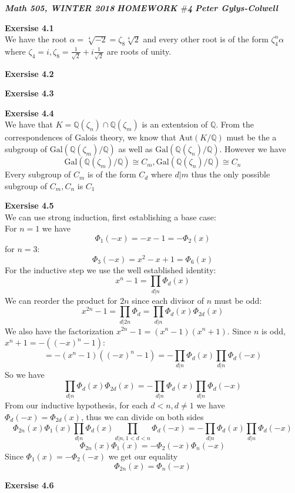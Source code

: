 \documentclass[12pt]{article}
\newenvironment{ques}[1]{\textbf{Exersise #1}\vspace{1 mm}\\ }{\bigskip}
\theoremstyle{definition}
\newcommand{\Q}{\mathbb Q}
\renewcommand{\a}{\alpha}
\newcommand{\Aut}{\text{Aut}}
\newcommand{\Gal}{\text{Gal}}
\begin{document}
\noindent \textit{\textbf{Math 505, WINTER 2018}} \hspace{1.3cm}
\textit{\textbf{HOMEWORK $\#$4}} \hspace{1.3cm} \textit{\textbf{Peter
Gylys-Colwell}} 

\vspace{1cm}

\begin{ques}{4.1}
	We have the root $\a = \sqrt[4]{-2} = \zeta_8\sqrt[4]{2}$ and every other root is
	of the form $\zeta_4^n\a$ where $\zeta_4 = i, \zeta_8 = \frac 1 {\sqrt 2} +
	i \frac 1 {\sqrt 2}$ are roots of unity.\\
\end{ques}

\begin{ques}{4.2}
	
\end{ques}

\begin{ques}{4.3}
	
\end{ques}

\begin{ques}{4.4}
	We have that $K = \Q(\zeta_n) \cap \Q(\zeta_m)$ is an extentsion of $\Q$.
	From the correspondences of Galois theory, we know that $\Aut(K/\Q)$ must be the
	a subgroup of $\Gal(\Q(\zeta_m)/\Q)$ as well as $\Gal(\Q(\zeta_n)/\Q)$.
	However we have
	$$\Gal(\Q(\zeta_m)/\Q) \cong C_m, \Gal(\Q(\zeta_n)/\Q) \cong C_n$$
	Every subgroup of $C_m$ is of the form $C_d$ where $d|m$ thus the only
	possible subgroup of $C_m, C_n$ is $C_1$
\end{ques}

\begin{ques}{4.5}
	We can use strong induction, first establishing a base case:\\
	For $n = 1$ we have
	$$\Phi_1(-x) = -x - 1 = -\Phi_2(x)$$
	for $n = 3$:
	$$\Phi_3(-x) = x^2 - x + 1 = \Phi_6(x)$$
	For the inductive step we use the well established identity:
	$$x^n - 1 = \prod_{d | n} \Phi_d(x)$$
	We can reorder the product for $2n$ since each divisor of $n$ must be odd:
	$$x^{2n} - 1 = \prod_{d|2n}\Phi_d = \prod_{d|n}\Phi_d(x) \Phi_{2d}(x) $$
	We also have the factorization $x^{2n} - 1 = (x^n - 1)(x^n + 1)$. Since $n$
	is odd, $x^n + 1 = -((-x)^n - 1)$:
	$$= -(x^n - 1)((-x)^n - 1) = -\prod_{d | n} \Phi_d(x)\prod_{d | n}
	\Phi_d(-x) $$
	So we have
	$$\prod_{d|n}\Phi_d(x) \Phi_{2d}(x) =-\prod_{d | n} \Phi_d(x)\prod_{d | n}
	\Phi_d(-x) $$
	From our inductive hypothesis, for each $d < n, d \neq 1$ we have
	$\Phi_d(-x) = \Phi_{2d}(x)$, thus we can divide on both sides
	$$\Phi_{2n}(x)\Phi_1(x)\prod_{d|n} \Phi_d(x) \prod_{d|n, 1 < d <
	n}\Phi_{d}(-x) =-\prod_{d | n} \Phi_d(x)\prod_{d | n} \Phi_d(-x) $$
	$$\Phi_{2n}(x)\Phi_1(x) = -\Phi_2(-x)\Phi_n(-x)$$
	Since $\Phi_1(x) = -\Phi_2(-x)$ we get our equality
	$$\Phi_{2n}(x) = \Phi_n(-x)$$
\end{ques}

\begin{ques}{4.6}
\end{ques}
\end{document}
